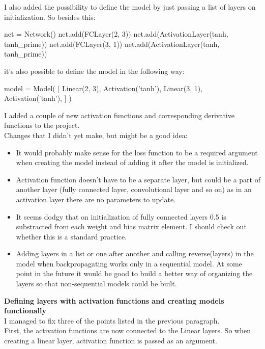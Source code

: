 \documentclass{article}
\begin{document}
I also added the possibility to define the model by just passing a list of layers on initialization. So besides this:
\begin{python}
    net = Network()
    net.add(FCLayer(2, 3))
    net.add(ActivationLayer(tanh, tanh_prime))
    net.add(FCLayer(3, 1))
    net.add(ActivationLayer(tanh, tanh_prime))
\end{python}
\pagebreak
it's also possible to define the model in the following way:
\begin{python}
    model = Model(
        [
            Linear(2, 3),
            Activation('tanh'),
            Linear(3, 1),
            Activation('tanh'),
        ]
    )
\end{python}

I added a couple of new activation functions and corresponding derivative functions to the project. \\

Changes that I didn't yet make, but might be a good idea:
\begin{itemize}
    \item It would probably make sense for the loss function to be a required argument when creating the model instead of adding it after 
    the model is initialized.
    \item Activation function doesn't have to be a separate layer, but could be a part of another layer (fully connected layer, convolutional layer and so on)
    as in an activation layer there are no parameters to update.
    \item It seems dodgy that on initialization of fully connected layers 0.5 is substracted from each weight and bias matrix element. I should check 
    out whether this is a standard practice.
    \item Adding layers in a list or one after another and calling reverse(layers) in the model when backpropagating works only in a sequential model. At some point in the future it would 
    be good to build a better way of organizing the layers so that non-sequential models could be built.
\end{itemize}

\textbf{Defining layers with activation functions and creating models functionally} \\

I managed to fix three of the points listed in the previous paragraph. \\

First, the activation functions are now connected to the Linear layers. So when creating a linear layer, activation function is passed 
as an argument. \\
\end{document}
